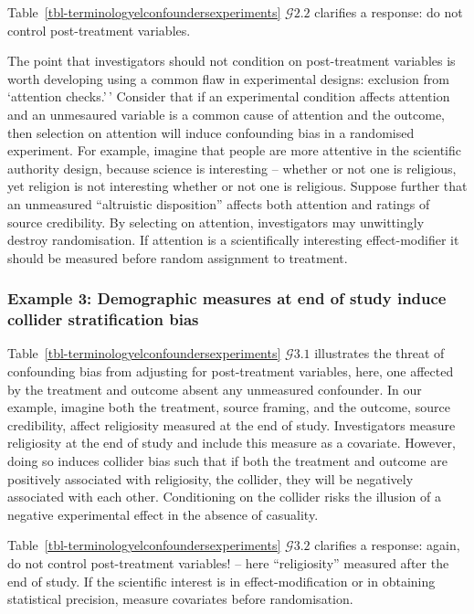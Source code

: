 \documentclass[
  single column]{article}
\begin{document}
Table~\ref{tbl-terminologyelconfoundersexperiments} \(\mathcal{G} 2.2\)
clarifies a response: do not control post-treatment variables.

The point that investigators should not condition on post-treatment
variables is worth developing using a common flaw in experimental
designs: exclusion from `attention checks.'\,' Consider that if an
experimental condition affects attention and an unmesaured variable is a
common cause of attention and the outcome, then selection on attention
will induce confounding bias in a randomised experiment. For example,
imagine that people are more attentive in the scientific authority
design, because science is interesting -- whether or not one is
religious, yet religion is not interesting whether or not one is
religious. Suppose further that an unmeasured ``altruistic disposition''
affects both attention and ratings of source credibility. By selecting
on attention, investigators may unwittingly destroy randomisation. If
attention is a scientifically interesting effect-modifier it should be
measured before random assignment to treatment.

\subsubsection{Example 3: Demographic measures at end of study induce
collider stratification
bias}\label{example-3-demographic-measures-at-end-of-study-induce-collider-stratification-bias}

Table~\ref{tbl-terminologyelconfoundersexperiments} \(\mathcal{G} 3.1\)
illustrates the threat of confounding bias from adjusting for
post-treatment variables, here, one affected by the treatment and
outcome absent any unmeasured confounder. In our example, imagine both
the treatment, source framing, and the outcome, source credibility,
affect religiosity measured at the end of study. Investigators measure
religiosity at the end of study and include this measure as a covariate.
However, doing so induces collider bias such that if both the treatment
and outcome are positively associated with religiosity, the collider,
they will be negatively associated with each other. Conditioning on the
collider risks the illusion of a negative experimental effect in the
absence of casuality.

Table~\ref{tbl-terminologyelconfoundersexperiments} \(\mathcal{G} 3.2\)
clarifies a response: again, do not control post-treatment variables! --
here ``religiosity'' measured after the end of study. If the scientific
interest is in effect-modification or in obtaining statistical
precision, measure covariates before randomisation.
\end{document}
